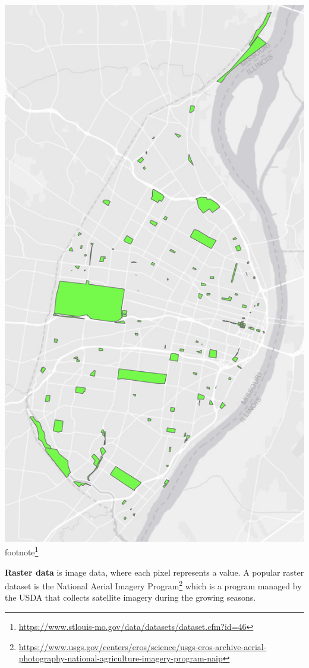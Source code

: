 \documentclass[
  krantz2]{krantz}
\begin{document}
\includegraphics{tmap-images/polygons.png}
footnote\footnote{\url{https://www.stlouis-mo.gov/data/datasets/dataset.cfm?id=46}}

\textbf{Raster data} is image data, where each pixel represents a value. A popular raster dataset is the National Aerial Imagery Program\footnote{\url{https://www.usgs.gov/centers/eros/science/usgs-eros-archive-aerial-photography-national-agriculture-imagery-program-naip}} which is a program managed by the USDA that collects satellite imagery during the growing seasons.
\end{document}
